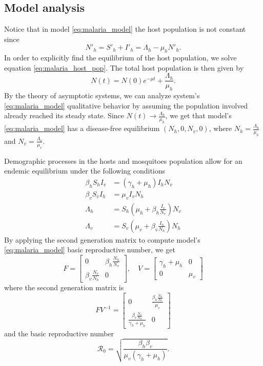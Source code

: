 \documentclass{book}
\begin{document}
\subsection*{Model analysis}
Notice that in model \eqref{eq:malaria_model} the host population is not constant since
\begin{equation} \label{eq:malaria_host_pop}
   N'_h=S'_h+I'_h=\Lambda_h-\mu_h N'_h.
\end{equation}
In order to explicitly find the equilibrium of the host population, we solve equation \eqref{eq:malaria_host_pop}. The total host population is then given by $$N(t)=N(0)e^{-\mu t}+\frac{\Lambda_h}{\mu_h}.$$ By the theory of asymptotic systems, we can analyze system's \eqref{eq:malaria_model} qualitative behavior by assuming the population involved already reached its steady state. Since $N(t)\rightarrow \frac{\Lambda_h}{\mu_h}$, we get that model's \eqref{eq:malaria_model} has a disease-free equilibrium $(N_h,0,N_v,0)$, where $N_h=\frac{\Lambda_h}{\mu_h}$ and $N_v=\frac{\Lambda_v}{\mu_v}$. 

Demographic processes in the hosts and mosquitoes population allow for an endemic equilibrium under the following conditions
\begin{align}
\nonumber \beta_{h} S_{h} I_{v} &=\left(\gamma_{h}+\mu_{h}\right) I_{h} N_{v} \\
\nonumber \beta_{v} S_{v} I_{h} &=\mu_{v} I_{v}N_h \\
 \Lambda_{h} &=S_{h}\left(\mu_{h}+\beta_{h} \frac{I_{v}}{N_{v}}\right) N_{v} \\
\nonumber \Lambda_{v} &=S_{v}\left(\mu_{v}+\beta_{v} \frac{I_{h}}{N_{h}}\right)N_{h}
\end{align}
%
By applying the second generation matrix to compute model's \eqref{eq:malaria_model} basic reproductive number, we get
$$
F=\left[\begin{array}{cc}
0 & \beta_{h} \frac{N_{h}}{N_{v}} \\
\beta_{v} \frac{N_{v}}{N_{h}} & 0
\end{array}\right], \quad V=\left[\begin{array}{cc}
\gamma_{h}+\mu_{h} & 0 \\
0 & \mu_{v}
\end{array}\right]
$$
where the second generation matrix is
$$
F V^{-1}=\left[\begin{array}{cc}
0 & \frac{\beta_{h} \frac{N_{h}}{N_{v}}}{\mu_{v}} \\
\frac{\beta_{v} \frac{N_{v}}{N_{h}}}{\gamma_{h}+\mu_{h}} & 0
\end{array}\right]
$$
and the basic reproductive number
\begin{equation} \label{eq:malaria_brn}
\mathscr{R}_{0}=\sqrt{\frac{\beta_{h} \beta_{v}}{\mu_{v}\left(\gamma_{h}+\mu_{h}\right)}}.
\end{equation}
\end{document}
